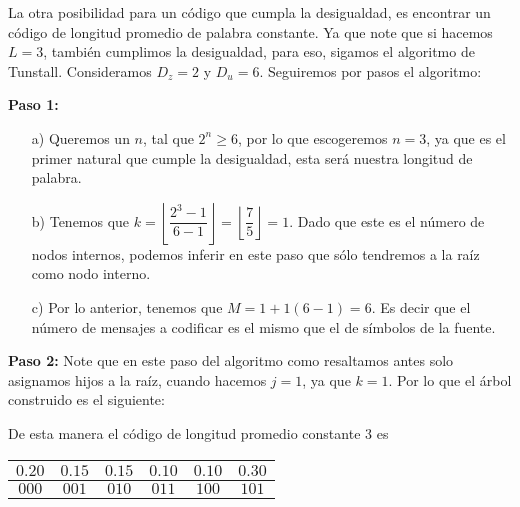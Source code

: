 \begin{sols}
 La otra posibilidad para un código que cumpla la desigualdad, es encontrar un código de longitud promedio de palabra constante. Ya que note que si hacemos $L=3$, también cumplimos la desigualdad, para eso, sigamos el algoritmo de Tunstall. Consideramos $D_z=2$ y $D_u=6.$ Seguiremos por pasos el algoritmo:

\textbf{Paso 1:}
\begin{itemize}
    \item[a)] Queremos un $n$, tal que $2^n\geq 6$, por lo que escogeremos $n=3$, ya que es el primer natural que cumple la desigualdad, esta será nuestra longitud de palabra.
    \item[b)] Tenemos que $k=\left\lfloor\dfrac{2^3-1}{6-1}\right\rfloor=\left\lfloor\dfrac{7}{5}\right\rfloor=1.$ Dado que este es el número de nodos internos, podemos inferir en este paso que sólo tendremos a la raíz como nodo interno.
    \item[c)] Por lo anterior, tenemos que $M=1+1(6-1)=6.$ Es decir que el número de mensajes a codificar es el mismo que el de símbolos de la fuente.
\end{itemize}
\textbf{Paso 2:}
 Note que en este paso del algoritmo como resaltamos antes solo asignamos hijos a la raíz, cuando hacemos $j=1$, ya que $k=1.$ Por  lo que el árbol construido es el siguiente:
 \begin{center}
    \end{center}
De esta manera el código de longitud promedio constante 3 es
\begin{center}
  \begin{tabular}{|c|c|c|c|c|c|}
  \hline
$0.20$ & $0.15$ & $0.15$ & $0.10$ & $0.10$ & $0.30$\\
\hline
$000$ & $001$ & $010$ & $011$ & $100$ & $101$\\
\hline
 \end{tabular}
 \end{center}

\end{sols}